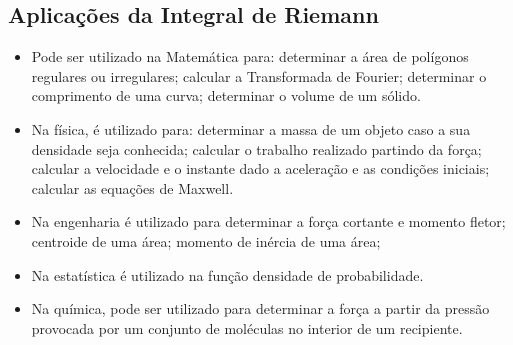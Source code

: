 \subsection{Aplicações da Integral de Riemann}

\begin{itemize}
\item Pode ser utilizado na Matemática para: determinar a área de polígonos regulares ou irregulares; calcular a Transformada de Fourier; determinar o comprimento de uma curva; determinar o volume de um sólido.
\item Na física, é utilizado para: determinar a massa de um objeto caso a sua densidade seja conhecida; calcular o trabalho realizado partindo da força; calcular a velocidade e o instante dado a aceleração e as condições iniciais; calcular as equações de Maxwell.
\item Na engenharia é utilizado para determinar a força cortante e momento fletor; centroide de uma área; momento de inércia de uma área;
\item Na estatística é utilizado na função densidade de probabilidade.
\item Na química, pode ser utilizado para determinar a força a partir da pressão provocada por um conjunto de moléculas no interior de um recipiente.
\end{itemize}
